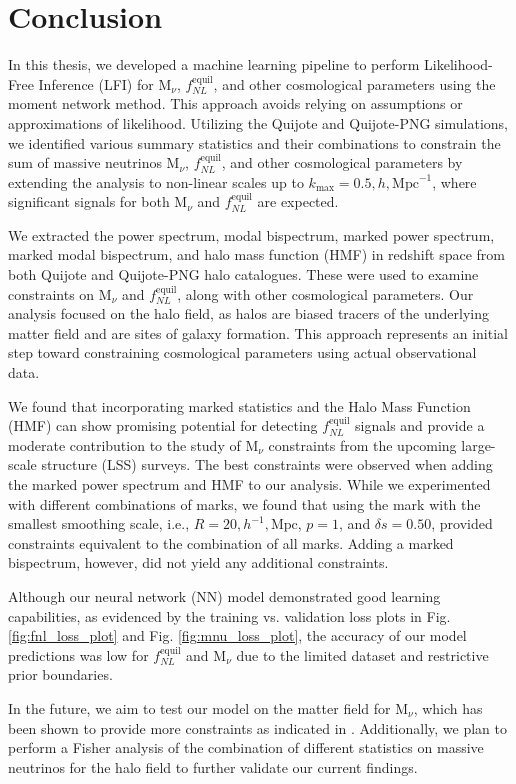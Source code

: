 \chapter{Conclusion}

In this thesis, we developed a machine learning pipeline to perform Likelihood-Free Inference (LFI) for $\mathrm{M}_{\nu}$, $f_{NL}^{\mathrm{equil}}$, and other cosmological parameters using the moment network method. This approach avoids relying on assumptions or approximations of likelihood. Utilizing the Quijote and Quijote-PNG simulations, we identified various summary statistics and their combinations to constrain the sum of massive neutrinos $\mathrm{M}_{\nu}$, $f_{NL}^{\mathrm{equil}}$, and other cosmological parameters by extending the analysis to non-linear scales up to $k_{\mathrm{max}} = 0.5,h,\mathrm{Mpc}^{-1}$, where significant signals for both $\mathrm{M}_{\nu}$ and $f_{NL}^{\mathrm{equil}}$ are expected.

We extracted the power spectrum, modal bispectrum, marked power spectrum, marked modal bispectrum, and halo mass function (HMF) in redshift space from both Quijote and Quijote-PNG halo catalogues. These were used to examine constraints on $\mathrm{M}_{\nu}$ and $f_{NL}^{\mathrm{equil}}$, along with other cosmological parameters. Our analysis focused on the halo field, as halos are biased tracers of the underlying matter field and are sites of galaxy formation. This approach represents an initial step toward constraining cosmological parameters using actual observational data.

We found that incorporating marked statistics and the Halo Mass Function (HMF) can show promising potential for detecting  $f_{NL}^{\mathrm{equil}}$ signals and provide a moderate contribution to the study of $\mathrm{M}_{\nu}$ constraints from the upcoming large-scale structure (LSS) surveys. The best constraints were observed when adding the marked power spectrum and HMF to our analysis. While we experimented with different combinations of marks, we found that using the mark with the smallest smoothing scale, i.e., $R = 20,h^{-1},\mathrm{Mpc}$, $p = 1$, and $\delta{s} = 0.50$, provided constraints equivalent to the combination of all marks. Adding a marked bispectrum, however, did not yield any additional constraints.

Although our neural network (NN) model demonstrated good learning capabilities, as evidenced by the training vs. validation loss plots in Fig. \ref{fig:fnl_loss_plot} and Fig. \ref{fig:mnu_loss_plot}, the accuracy of our model predictions was low for $f_{NL}^{\mathrm{equil}}$ and $\mathrm{M}_{\nu}$ due to the limited dataset and restrictive prior boundaries.

In the future, we aim to test our model on the matter field for $\mathrm{M}_{\nu}$, which has been shown to provide more constraints as indicated in \cite{Massara_2021}. Additionally, we plan to perform a Fisher analysis of the combination of different statistics on massive neutrinos for the halo field to further validate our current findings.
